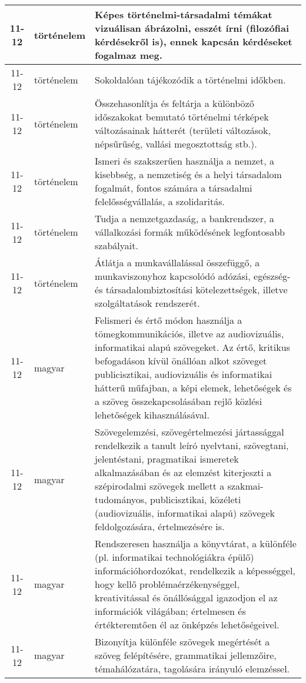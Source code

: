 \begin{small}
\begin{longtable}{c | p{2cm} |  p{11cm} }
              11-12 & történelem & Képes történelmi-társadalmi témákat vizuálisan ábrázolni, esszét írni (filozófiai kérdésekről is), ennek kapcsán kérdéseket fogalmaz meg. \\ \hline
              11-12 & történelem & Sokoldalóan tájékozódik a történelmi időkben. \\ \hline
              11-12 & történelem & Összehasonlítja és feltárja a különböző időszakokat bemutató történelmi térképek változásainak hátterét (területi változások, népsűrűség, vallási megosztottság stb.). \\ \hline
              11-12 & történelem & Ismeri és szakszerűen használja a nemzet, a kisebbség, a nemzetiség és a helyi társadalom fogalmát, fontos számára a társadalmi felelősségvállalás, a szolidaritás. \\ \hline
              11-12 & történelem & Tudja a nemzetgazdaság, a bankrendszer, a vállalkozási formák működésének legfontosabb szabályait. \\ \hline
              11-12 & történelem & Átlátja a munkavállalással összefüggő, a munkaviszonyhoz kapcsolódó adózási, egészség- és társadalombiztosítási kötelezettségek, illetve szolgáltatások rendszerét. \\ \hline
              11-12 & magyar & Felismeri és értő módon használja a tömegkommunikációs, illetve az audiovizuális, informatikai alapú szövegeket. Az értő, kritikus befogadáson kívül önállóan alkot szöveget  publicisztikai, audiovizuális és informatikai hátterű műfajban, a képi elemek, lehetőségek és a szöveg összekapcsolásában rejlő közlési lehetőségek kihasználásával. \\ \hline
              11-12 & magyar & Szövegelemzési, szövegértelmezési jártassággal rendelkezik a tanult leíró nyelvtani, szövegtani, jelentéstani, pragmatikai ismeretek alkalmazásában és az elemzést kiterjeszti a szépirodalmi szövegek mellett a szakmai-tudományos, publicisztikai, közéleti (audiovizuális, informatikai alapú) szövegek feldolgozására, értelmezésére is. \\ \hline
              11-12 & magyar & Rendszeresen használja a könyvtárat, a különféle (pl. informatikai technológiákra épülő) információhordozókat, rendelkezik a képességgel, hogy kellő problémaérzékenységgel, kreativitással és önállósággal igazodjon el az információk világában; értelmesen és értékteremtően él az önképzés lehetőségeivel. \\ \hline
              11-12 & magyar & Bizonyítja különféle szövegek megértését a szöveg felépítésére, grammatikai jellemzőire, témahálózatára, tagolására irányuló elemzéssel. \\ \hline

\end{longtable}
\end{small}
